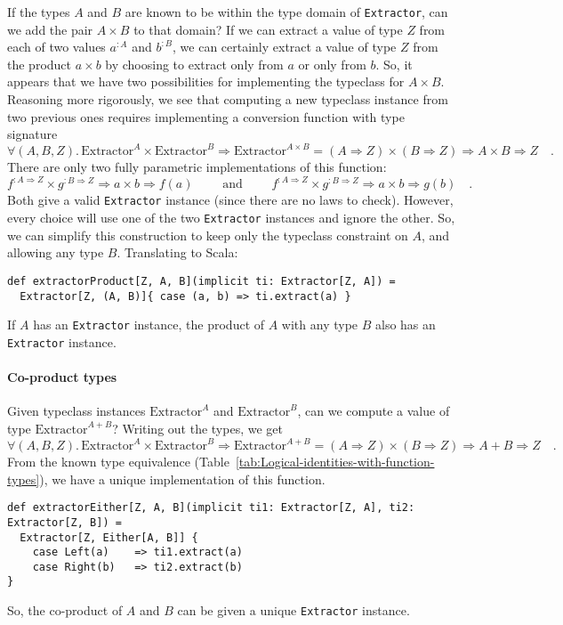 If the types $A$ and $B$ are known to be within the type domain
of \lstinline!Extractor!, can we add the pair $A\times B$ to that
domain? If we can extract a value of type $Z$ from each of two values
$a^{:A}$ and $b^{:B}$, we can certainly extract a value of type
$Z$ from the product $a\times b$ by choosing to extract only from
$a$ or only from $b$. So, it appears that we have two possibilities
for implementing the typeclass for $A\times B$. Reasoning more rigorously,
we see that computing a new typeclass instance from two previous ones
requires implementing a conversion function with type signature
\[
\forall(A,B,Z).\,\text{Extractor}^{A}\times\text{Extractor}^{B}\Rightarrow\text{Extractor}^{A\times B}=\left(A\Rightarrow Z\right)\times\left(B\Rightarrow Z\right)\Rightarrow A\times B\Rightarrow Z\quad.
\]
There are only two fully parametric implementations of this function:
\[
f^{:A\Rightarrow Z}\times g^{:B\Rightarrow Z}\Rightarrow a\times b\Rightarrow f(a)\quad\quad\text{ and }\quad\quad f^{:A\Rightarrow Z}\times g^{:B\Rightarrow Z}\Rightarrow a\times b\Rightarrow g(b)\quad.
\]
Both give a valid \lstinline!Extractor! instance (since there are
no laws to check). However, every choice will use one of the two \lstinline!Extractor!
instances and ignore the other. So, we can simplify this construction
to keep only the typeclass constraint on $A$, and allowing any type
$B$. Translating to Scala:
\begin{lstlisting}
def extractorProduct[Z, A, B](implicit ti: Extractor[Z, A]) =
  Extractor[Z, (A, B)]{ case (a, b) => ti.extract(a) }
\end{lstlisting}
If $A$ has an \lstinline!Extractor! instance, the product of $A$
with any type $B$ also has an \lstinline!Extractor! instance.

\paragraph{Co-product types}

Given typeclass instances $\text{Extractor}^{A}$ and $\text{Extractor}^{B}$,
can we compute a value of type $\text{Extractor}^{A+B}$? Writing
out the types, we get
\[
\forall(A,B,Z).\,\text{Extractor}^{A}\times\text{Extractor}^{B}\Rightarrow\text{Extractor}^{A+B}=\left(A\Rightarrow Z\right)\times\left(B\Rightarrow Z\right)\Rightarrow A+B\Rightarrow Z\quad.
\]
From the known type equivalence (Table~\ref{tab:Logical-identities-with-function-types}),
we have a unique implementation of this function.
\begin{lstlisting}
def extractorEither[Z, A, B](implicit ti1: Extractor[Z, A], ti2: Extractor[Z, B]) =
  Extractor[Z, Either[A, B]] {
    case Left(a)    => ti1.extract(a)
    case Right(b)   => ti2.extract(b)
}
\end{lstlisting}
So, the co-product of $A$ and $B$ can be given a unique \lstinline!Extractor!
instance.

